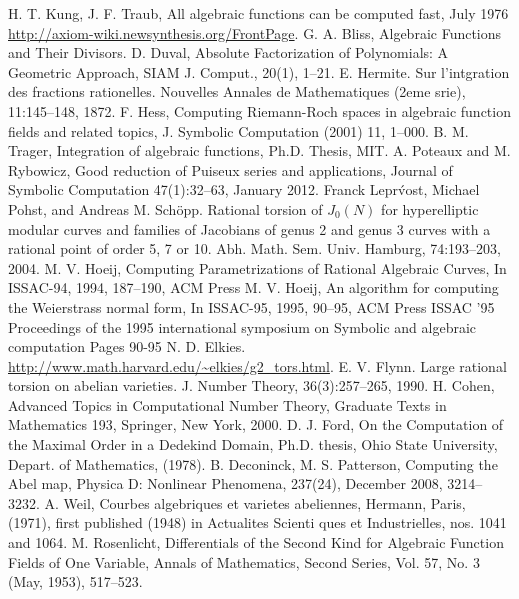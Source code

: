\documentclass[12pt,reqno]{amsart}
\numberwithin{equation}{section}
\begin{document}
\begin{thebibliography}{99}
 H. T. Kung, J. F. Traub, All algebraic functions can be computed fast, July 1976
 \url{http://axiom-wiki.newsynthesis.org/FrontPage}.
 G. A. Bliss, Algebraic Functions and Their Divisors.
 D. Duval, Absolute Factorization of Polynomials: A Geometric Approach, SIAM J. Comput., 20(1), 1--21.
 E. Hermite. Sur l’intgration des fractions rationelles. Nouvelles Annales de Mathematiques (2eme srie), 11:145--148, 1872.
 F. Hess, Computing Riemann-Roch spaces in algebraic function fields and related topics, J. Symbolic Computation (2001) 11, 1--000.
 B. M. Trager, Integration of algebraic functions, Ph.D. Thesis, MIT.
 A. Poteaux and M. Rybowicz, Good reduction of Puiseux series and applications, Journal of Symbolic Computation 47(1):32--63, January 2012.
 Franck Lepr\'vost, Michael Pohst, and Andreas M. Schöpp. Rational torsion of $J_0(N)$ for hyperelliptic modular curves and families of Jacobians of genus 2 and genus 3 curves with a rational point of order 5, 7 or 10. Abh. Math. Sem. Univ. Hamburg, 74:193--203, 2004.
 M. V. Hoeij, Computing Parametrizations of Rational Algebraic Curves, In ISSAC-94, 1994, 187--190, ACM Press
 M. V. Hoeij, An algorithm for computing the Weierstrass normal form, In ISSAC-95, 1995, 90--95, ACM Press ISSAC '95 Proceedings of the 1995 international symposium on Symbolic and algebraic computation
Pages 90-95 
 N. D. Elkies. \url{http://www.math.harvard.edu/~elkies/g2_tors.html}.
 E. V. Flynn. Large rational torsion on abelian varieties. J. Number Theory, 36(3):257--265, 1990.
 H. Cohen, Advanced Topics in Computational Number Theory, Graduate Texts in Mathematics 193, Springer, New York, 2000.
 D. J. Ford, On the Computation of the Maximal Order in a Dedekind Domain, Ph.D. thesis, Ohio State University, Depart. of Mathematics, (1978).
 B. Deconinck, M. S. Patterson, Computing the Abel map, Physica D: Nonlinear Phenomena, 237(24), December 2008, 3214--3232.
 A. Weil, Courbes algebriques et varietes abeliennes, Hermann, Paris, (1971), first published (1948) in Actualites Scienti ques et Industrielles, nos. 1041 and 1064.
 M. Rosenlicht, Differentials of the Second Kind for Algebraic Function Fields of One Variable, Annals of Mathematics, Second Series, Vol. 57, No. 3 (May, 1953), 517--523.
\end{thebibliography}
\end{document}
